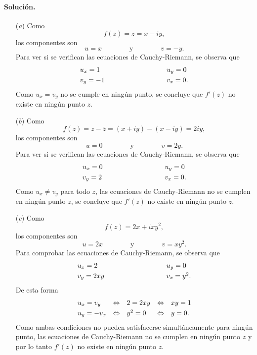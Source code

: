 \documentclass[a4paper]{report}
\begin{document}
\paragraph{Solución.} 

\begin{enumerate}
 \item[(\textit{a})] Como
 \[
  f(z)=\overline{z}=x-iy,
 \]
 los componentes son 
 \[
  u=x
  \qquad\qquad\textrm{y}\qquad\qquad
  v=-y.
 \]
 Para ver si se verifican las ecuaciones de Cauchy-Riemann, se observa que 
 \[
 \begin{array}{ll}
  u_x=1\qquad\qquad\qquad\qquad&u_y=0\\[\smallskipamount]
  v_y=-1\qquad\qquad\qquad\qquad&v_x=0.
 \end{array}
 \]
 Como \(u_x=v_y\) no se cumple en ningún punto, se concluye que \(f'(z)\) no existe en ningún punto \(z\).
 \item[(\textit{b})] Como
 \[
  f(z)=z-\overline{z}=(x+iy)-(x-iy)=2iy,
 \]
 los componentes son 
 \[
  u=0
  \qquad\qquad\textrm{y}\qquad\qquad
  v=2y.
 \]
 Para ver si se verifican las ecuaciones de Cauchy-Riemann, se observa que 
 \[
 \begin{array}{ll}
  u_x=0\qquad\qquad\qquad\qquad&u_y=0\\[\smallskipamount]
  v_y=2\qquad\qquad\qquad\qquad&v_x=0.
 \end{array}
 \]
 Como \(u_x\neq v_y\) para todo \(z\), las ecuaciones de Cauchy-Riemann no se cumplen en ningún punto \(z\), se concluye que \(f'(z)\) no existe en ningún punto \(z\).
 \item[(\textit{c})] Como
 \[
  f(z)=2x+ixy^2,
 \]
 los componentes son 
 \[
  u=2x
  \qquad\qquad\textrm{y}\qquad\qquad
  v=xy^2.
 \]
 Para comprobar las ecuaciones de Cauchy-Riemann, se observa que 
 \[
 \begin{array}{ll}
  u_x=2\qquad\qquad\qquad\qquad&u_y=0\\[\smallskipamount]
  v_y=2xy\qquad\qquad\qquad\qquad&v_x=y^2.
 \end{array}
 \]
 De esta forma
 \[
 \begin{array}{lllll}
  u_x=v_y&\Leftrightarrow&2=2xy&\Leftrightarrow&xy=1\\[\smallskipamount]
  u_y=-v_x&\Leftrightarrow&y^2=0&\Leftrightarrow&y=0.
 \end{array}
 \] 
 Como ambas condiciones no pueden satisfacerse simultáneamente para ningún punto, las ecuaciones de Cauchy-Riemann no se cumplen en ningún punto \(z\) y por lo tanto \(f'(z)\) no existe en ningún punto \(z\).

\end{enumerate}
\end{document}
